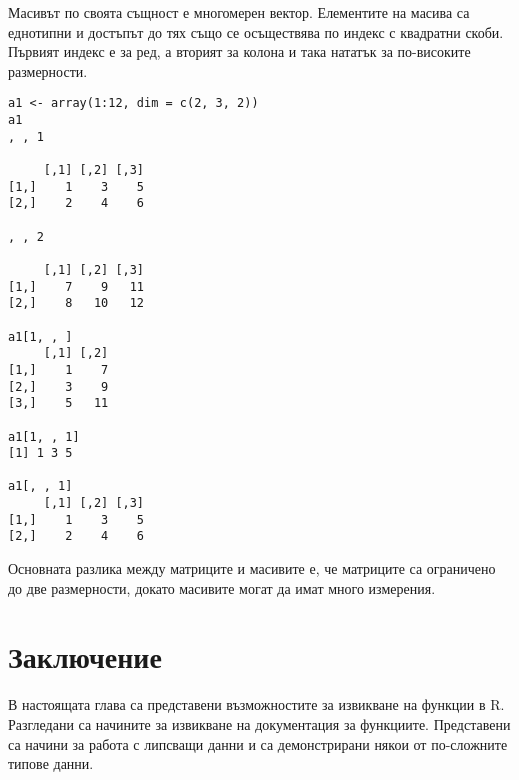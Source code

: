 Масивът по своята същност е многомерен вектор. Елементите на масива са еднотипни и достъпът до тях също се осъществява по индекс с квадратни скоби. Първият индекс е за ред, а вторият за колона и така нататък за по-високите размерности.

\begin{lstlisting}[caption=Работа с масиви, label=listing0052]
a1 <- array(1:12, dim = c(2, 3, 2))
a1
, , 1

     [,1] [,2] [,3]
[1,]    1    3    5
[2,]    2    4    6

, , 2

     [,1] [,2] [,3]
[1,]    7    9   11
[2,]    8   10   12

a1[1, , ]
     [,1] [,2]
[1,]    1    7
[2,]    3    9
[3,]    5   11
 
a1[1, , 1]
[1] 1 3 5
 
a1[, , 1]
     [,1] [,2] [,3]
[1,]    1    3    5
[2,]    2    4    6
\end{lstlisting}

Основната разлика между матриците и масивите е, че матриците са ограничено до две размерности, докато масивите могат да имат много измерения.

\section*{Заключение}

В настоящата глава са представени възможностите за извикване на функции в R. Разгледани са начините за извикване на документация за функциите. Представени са начини за работа с липсващи данни и са демонстрирани някои от по-сложните типове данни. 

